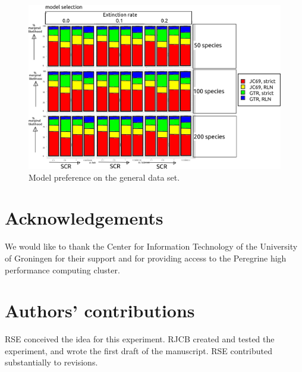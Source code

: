 \begin{figure}[!htbp]
  \includegraphics[width=\textwidth]{fig_model_selection.png}
  \caption{
    Model preference on the general data set.
  }
\end{figure}


\section{Acknowledgements}

We would like to thank the Center for Information Technology of the University of Groningen for their support
and for providing access to the Peregrine high performance computing cluster.

\section{Authors' contributions}

RSE conceived the idea for this experiment. 
RJCB created and tested the experiment, and wrote the first draft of the manuscript. 
RSE contributed substantially to revisions.

